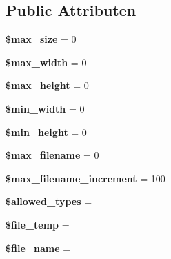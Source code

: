 \subsection*{Public Attributen}
\begin{DoxyCompactItemize}
\item 
\mbox{\label{class_c_i___upload_a3fec414be9f76cb7ba77ed79b784de62}} 
{\bfseries \$max\+\_\+size} = 0
\item 
\mbox{\label{class_c_i___upload_a7f6a5db40a5fd00c8babbd37480b00fc}} 
{\bfseries \$max\+\_\+width} = 0
\item 
\mbox{\label{class_c_i___upload_a7f2b56fde8cdd8907f9228149fc4b9bc}} 
{\bfseries \$max\+\_\+height} = 0
\item 
\mbox{\label{class_c_i___upload_ad481f92f436b46aa9e400c3350c1971d}} 
{\bfseries \$min\+\_\+width} = 0
\item 
\mbox{\label{class_c_i___upload_ade5021b056dd0ca6a46b293851ee8347}} 
{\bfseries \$min\+\_\+height} = 0
\item 
\mbox{\label{class_c_i___upload_a7c8c80e453111c2521e355b83331a9df}} 
{\bfseries \$max\+\_\+filename} = 0
\item 
\mbox{\label{class_c_i___upload_a95a9bbb06c792949b16879a515366b73}} 
{\bfseries \$max\+\_\+filename\+\_\+increment} = 100
\item 
\mbox{\label{class_c_i___upload_a2e0df9e15179e2db66d161206842d6c0}} 
{\bfseries \$allowed\+\_\+types} = \textquotesingle{}\textquotesingle{}
\item 
\mbox{\label{class_c_i___upload_a8b49917820e40f0b8956d95c1fd6ee6e}} 
{\bfseries \$file\+\_\+temp} = \textquotesingle{}\textquotesingle{}
\item 
\mbox{\label{class_c_i___upload_a59bf132c77b5bee5adff2098cc2a6fbc}} 
{\bfseries \$file\+\_\+name} = \textquotesingle{}\textquotesingle{}
\item 
\mbox{\label{class_c_i___upload_a2704f7723b97b03285de219442ae3e2b}} 

\end{DoxyCompactItemize}
